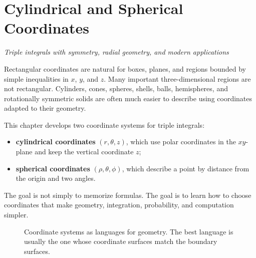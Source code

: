 \documentclass[11pt,oneside]{book}
\begin{document}
\setcounter{chapter}{16}
\chapter{Cylindrical and Spherical Coordinates}
\vspace{-0.8em}
{\large\itshape Triple integrals with symmetry, radial geometry, and modern applications}

\begin{mainideabox}
Rectangular coordinates are natural for boxes, planes, and regions bounded by simple inequalities in $x$, $y$, and $z$. Many important three-dimensional regions are not rectangular. Cylinders, cones, spheres, shells, balls, hemispheres, and rotationally symmetric solids are often much easier to describe using coordinates adapted to their geometry.

This chapter develops two coordinate systems for triple integrals:
\begin{itemize}
  \item \textbf{cylindrical coordinates} $(r,\theta,z)$, which use polar coordinates in the $xy$-plane and keep the vertical coordinate $z$;
  \item \textbf{spherical coordinates} $(\rho,\theta,\phi)$, which describe a point by distance from the origin and two angles.
\end{itemize}
The goal is not simply to memorize formulas. The goal is to learn how to choose coordinates that make geometry, integration, probability, and computation simpler.
\end{mainideabox}

\begin{figure}[H]
\centering
{}
\caption{Coordinate systems as languages for geometry. The best language is usually the one whose coordinate surfaces match the boundary surfaces.}
\end{figure}
\end{document}

